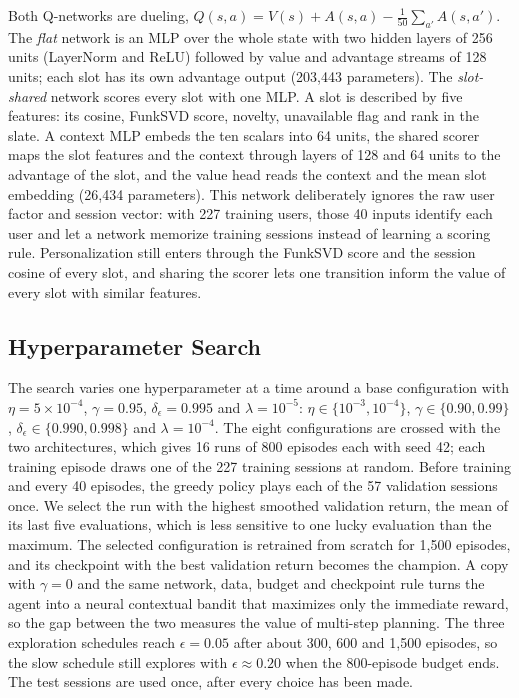 Both Q-networks are dueling, $Q(s,a) = V(s) + A(s,a) - \frac{1}{50}\sum_{a'} A(s,a')$. The \emph{flat} network is an MLP over the whole state with two hidden layers of 256 units (LayerNorm and ReLU) followed by value and advantage streams of 128 units; each slot has its own advantage output (203{,}443 parameters). The \emph{slot-shared} network scores every slot with one MLP. A slot is described by five features: its cosine, FunkSVD score, novelty, unavailable flag and rank in the slate. A context MLP embeds the ten scalars into 64 units, the shared scorer maps the slot features and the context through layers of 128 and 64 units to the advantage of the slot, and the value head reads the context and the mean slot embedding (26{,}434 parameters). This network deliberately ignores the raw user factor and session vector: with 227 training users, those 40 inputs identify each user and let a network memorize training sessions instead of learning a scoring rule. Personalization still enters through the FunkSVD score and the session cosine of every slot, and sharing the scorer lets one transition inform the value of every slot with similar features.

\subsection{Hyperparameter Search}
\label{sec:search}

The search varies one hyperparameter at a time around a base configuration with $\eta = 5\times10^{-4}$, $\gamma = 0.95$, $\delta_\epsilon = 0.995$ and $\lambda = 10^{-5}$: $\eta \in \{10^{-3}, 10^{-4}\}$, $\gamma \in \{0.90, 0.99\}$, $\delta_\epsilon \in \{0.990, 0.998\}$ and $\lambda = 10^{-4}$. The eight configurations are crossed with the two architectures, which gives 16 runs of 800 episodes each with seed 42; each training episode draws one of the 227 training sessions at random. Before training and every 40 episodes, the greedy policy plays each of the 57 validation sessions once. We select the run with the highest smoothed validation return, the mean of its last five evaluations, which is less sensitive to one lucky evaluation than the maximum. The selected configuration is retrained from scratch for 1{,}500 episodes, and its checkpoint with the best validation return becomes the champion. A copy with $\gamma = 0$ and the same network, data, budget and checkpoint rule turns the agent into a neural contextual bandit that maximizes only the immediate reward, so the gap between the two measures the value of multi-step planning. The three exploration schedules reach $\epsilon = 0.05$ after about 300, 600 and 1{,}500 episodes, so the slow schedule still explores with $\epsilon \approx 0.20$ when the 800-episode budget ends. The test sessions are used once, after every choice has been made.


